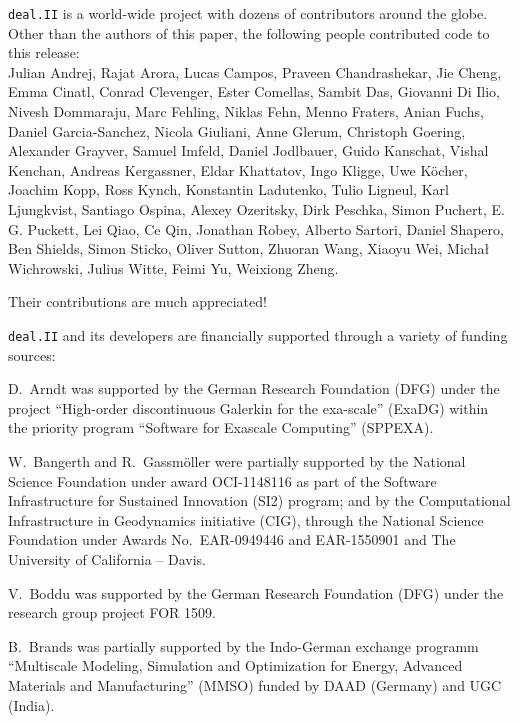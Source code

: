 \documentclass{ansarticle-preprint}
\newcommand{\specialword}[1]{\texttt{#1}}
\newcommand{\dealii}{{\specialword{deal.II}}}
\begin{document}
\dealii{} is a world-wide project with dozens of contributors around the
globe. Other than the authors of this paper, the following people contributed code to
this release:\\
%
%
Julian Andrej,
Rajat Arora,
Lucas Campos,
Praveen Chandrashekar,
Jie Cheng,
Emma Cinatl,
Conrad Clevenger,
Ester Comellas,
Sambit Das,
Giovanni Di Ilio,
Nivesh Dommaraju,
Marc Fehling,
Niklas Fehn,
Menno Fraters,
Anian Fuchs,
Daniel Garcia-Sanchez,
Nicola Giuliani,
Anne Glerum,
Christoph Goering,
Alexander Grayver,
Samuel Imfeld,
Daniel Jodlbauer,
Guido Kanschat,
Vishal Kenchan,
Andreas Kergassner,
Eldar Khattatov,
Ingo Kligge,
Uwe Köcher,
Joachim Kopp,
Ross Kynch,
Konstantin Ladutenko,
Tulio Ligneul,
Karl Ljungkvist,
Santiago Ospina,
Alexey Ozeritsky,
Dirk Peschka,
Simon Puchert,
E. G. Puckett,
Lei Qiao,
Ce Qin,
Jonathan Robey,
Alberto Sartori,
Daniel Shapero,
Ben Shields,
Simon Sticko,
Oliver Sutton,
Zhuoran Wang,
Xiaoyu Wei,
Michał Wichrowski,
Julius Witte,
Feimi Yu,
Weixiong Zheng.

Their contributions are much appreciated!


\bigskip

\dealii{} and its developers are financially supported through a
variety of funding sources:

D.~Arndt was supported by the German Research Foundation (DFG) under the
project ``High-order discontinuous Galerkin for the exa-scale'' (ExaDG) within the
priority program ``Software for Exascale Computing'' (SPPEXA).

W.~Bangerth and R.~Gassm\"{o}ller were partially
supported by the National Science Foundation under award OCI-1148116
as part of the Software Infrastructure for Sustained Innovation (SI2)
program; and by the Computational Infrastructure in Geodynamics initiative
(CIG), through the National Science Foundation under Awards
No.~EAR-0949446 and EAR-1550901 and The University of California -- Davis.

V.~Boddu was supported by the German Research Foundation (DFG) under the
research group project FOR 1509.

B.~Brands was partially supported by the Indo-German exchange programm
``Multiscale Modeling, Simulation and Optimization for Energy, Advanced
Materials and Manufacturing'' (MMSO) funded by DAAD (Germany) and UGC
(India).
\end{document}
